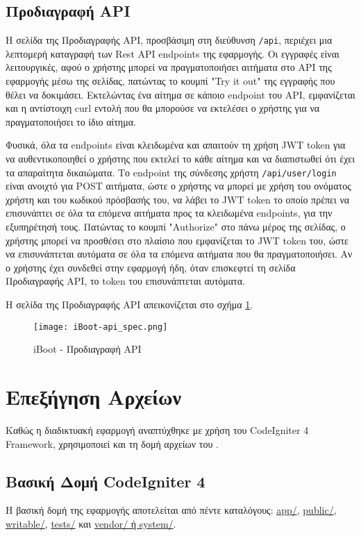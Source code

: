 \subsection{Προδιαγραφή API}
\FloatBarrier
Η σελίδα της Προδιαγραφής API, προσβάσιμη στη διεύθυνση \verb!/api!, περιέχει μια λεπτομερή καταγραφή των Rest API endpoints της εφαρμογής. Οι εγγραφές είναι λειτουργικές, αφού ο χρήστης μπορεί να πραγματοποιήσει αιτήματα στο API της εφαρμογής μέσω της σελίδας, πατώντας το κουμπί "Try it out" της εγγραφής που θέλει να δοκιμάσει. Εκτελώντας ένα αίτημα σε κάποιο endpoint του API, εμφανίζεται και η αντίστοιχη curl εντολή που θα μπορούσε να εκτελέσει ο χρήστης για να πραγματοποιήσει το ίδιο αίτημα.

Φυσικά, όλα τα endpoints είναι κλειδωμένα και απαιτούν τη χρήση JWT token για να αυθεντικοποιηθεί ο χρήστης που εκτελεί το κάθε αίτημα και να διαπιστωθεί ότι έχει τα απαραίτητα δικαιώματα. Το endpoint της σύνδεσης χρήστη \verb!/api/user/login! είναι ανοιχτό για POST αιτήματα, ώστε ο χρήστης να μπορεί με χρήση του ονόματος χρήστη και του κωδικού πρόσβασής του, να λάβει το JWT token το οποίο πρέπει να επισυνάπτει σε όλα τα επόμενα αιτήματα προς τα κλειδωμένα endpoints, για την εξυπηρέτησή τους. Πατώντας το κουμπί "Authorize" στο πάνω μέρος της σελίδας, ο χρήστης μπορεί να προσθέσει στο πλαίσιο που εμφανίζεται το JWT token του, ώστε να επισυνάπτεται αυτόματα σε όλα τα επόμενα αιτήματα που θα πραγματοποιήσει. Αν ο χρήστης έχει συνδεθεί στην εφαρμογή ήδη, όταν επισκεφτεί τη σελίδα Προδιαγραφής API, το token του επισυνάπτεται αυτόματα.

Η σελίδα της Προδιαγραφής API απεικονίζεται στο σχήμα \ref{fig:iBoot_api_spec}.
\begin{figure}[ht]
	\centering
	\texttt{[image: iBoot-api\_spec.png]}
	\caption{iBoot - Προδιαγραφή API}
	\label{fig:iBoot_api_spec}
\end{figure}
\FloatBarrier

\section{Επεξήγηση Αρχείων}
Καθώς η διαδικτυακή εφαρμογή αναπτύχθηκε με χρήση του CodeIgniter 4 Framework, χρησιμοποιεί και τη δομή αρχείων του \cite{CodeIgniter_structure}.

\subsection{Βασική Δομή CodeIgniter 4}
Η βασική δομή της εφαρμογής αποτελείται από πέντε καταλόγους: \hyperref[ui:app]{app/}, \hyperref[ui:public]{public/}, \hyperref[ui:writable]{writable/}, \hyperref[ui:tests]{tests/} και \hyperref[ui:system]{vendor/ ή system/}.

